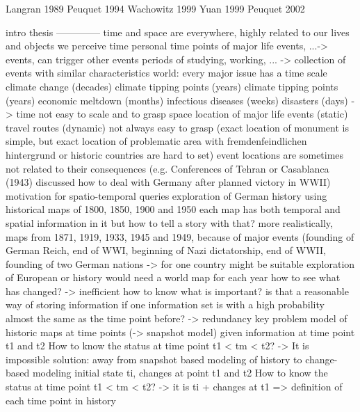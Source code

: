 
Langran 1989
Peuquet 1994
Wachowitz 1999
Yuan 1999
Peuquet 2002






intro thesis
--------------
time and space are everywhere, highly related to our lives and objects we perceive
time
  personal
    time points of major life events, ...-> events, can trigger other events
    periods of studying, working, ... -> collection of events with similar characteristics
  world: every major issue has a time scale
    climate change (decades)
    climate tipping points (years) climate tipping points (years)
    economic meltdown (months)
    infectious diseases (weeks)
    disasters (days)
  -> time not easy to scale and to grasp
space
  location of major life events (static)
  travel routes (dynamic)
  not always easy to grasp (exact location of monument is simple, but exact location of problematic area with fremdenfeindlichen hintergrund or historic countries are hard to set)
  event locations are sometimes not related to their consequences (e.g. Conferences of Tehran or Casablanca (1943) discussed how to deal with Germany after planned victory in WWII)
motivation for spatio-temporal queries
  exploration of German history using historical maps of 1800, 1850, 1900 and 1950
    each map has both temporal and spatial information in it
    but how to tell a story with that?
    more realistically, maps from 1871, 1919, 1933, 1945 and 1949, because of major events (founding of German Reich, end of WWI, beginning of Nazi dictatorship, end of WWII, founding of two German nations
    -> for one country might be suitable
  exploration of European or history
    would need a world map for each year
    how to see what has changed? -> inefficient
    how to know what is important?
    is that a reasonable way of storing information if one information set is with a high probability almost the same as the time point before? -> redundancy
  key problem
    model of historic maps at time points (-> snapshot model)
    given information at time point t1 and t2
    How to know the status at time point t1 < tm < t2?
    -> It is impossible
  solution: away from snapshot based modeling of history to change-based modeling
    initial state ti, changes at point t1 and t2
    How to know the status at time point t1 < tm < t2?
    -> it is ti + changes at t1
    => definition of each time point in history

